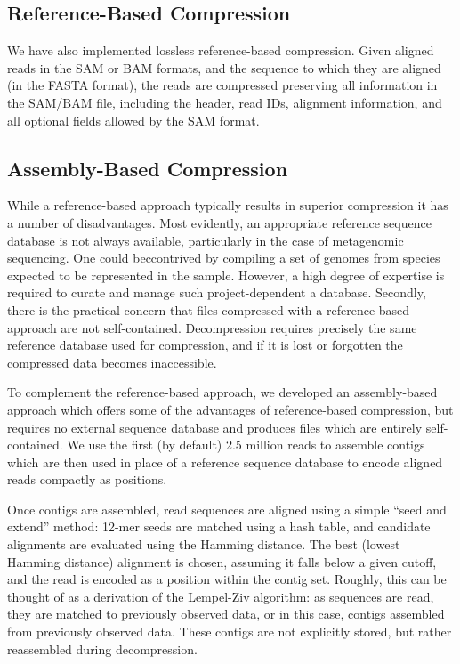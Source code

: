 \documentclass[twocolumn]{article}
\begin{document}
\subsection{Reference-Based Compression}

We have also implemented lossless reference-based compression. Given aligned
reads in the SAM or BAM formats, and the sequence to which they are aligned
(in the FASTA format), the reads are compressed preserving all information in
the SAM/BAM file, including the header, read IDs, alignment information, and
all optional fields allowed by the SAM format.


\subsection{Assembly-Based Compression}

While a reference-based approach typically results in superior compression it
has a number of disadvantages. Most evidently, an appropriate reference
sequence database is not always available, particularly in the case of metagenomic
sequencing. One could beccontrived by compiling a set of genomes from species
expected to be represented in the sample. However, a high degree of expertise
is required to curate and manage such project-dependent a database. Secondly,
there is the practical concern that files compressed with a reference-based
approach are not self-contained. Decompression requires precisely the same
reference database used for compression, and if it is lost or forgotten the
compressed data becomes inaccessible.

To complement the reference-based approach, we developed an assembly-based
approach which offers some of the advantages of reference-based compression,
but requires no external sequence database and produces files which are
entirely self-contained. We use the first (by default) 2.5 million reads to
assemble contigs which are then used in place of a reference sequence
database to encode aligned reads compactly as positions.

Once contigs are assembled, read sequences are aligned using a simple ``seed
and extend'' method: 12-mer seeds are matched using a hash table, and
candidate alignments are evaluated using the Hamming distance. The best
(lowest Hamming distance) alignment is chosen, assuming it falls below a given
cutoff, and the read is encoded as a position within the contig set. Roughly,
this can be thought of as a derivation of the Lempel-Ziv algorithm: as
sequences are read, they are matched to previously observed data, or in this
case, contigs assembled from previously observed data. These contigs are
not explicitly stored, but rather reassembled during decompression.
\end{document}

